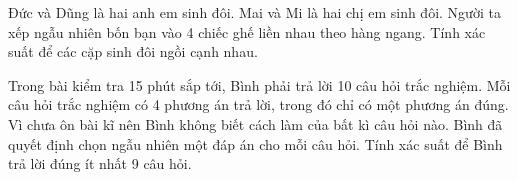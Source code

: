 \documentclass[%
    fontsize=12pt,%
    chapterprefix=false,%
    open=right,%
    twoside=false,%
    numbers=noenddot,%
    headings=optiontohead,%
    final,%
    DIV=15,%
    parskip=half %
]{scrbook}
\begin{document}
\begin{tuluan}
\item Đức và Dũng là hai anh em sinh đôi. Mai và Mi là hai chị em sinh đôi. Người ta xếp ngẫu nhiên bốn bạn vào 4 chiếc ghế liền nhau theo hàng ngang. Tính xác suất để các cặp sinh đôi ngồi cạnh nhau.

\item Trong bài kiểm tra 15 phút sắp tới, Bình phải trả lời 10 câu hỏi trắc nghiệm. Mỗi câu hỏi trắc nghiệm có 4 phương án trả lời, trong đó chỉ có một phương án đúng. Vì chưa ôn bài kĩ nên Bình không biết cách làm của bất kì câu hỏi nào. Bình đã quyết định chọn ngẫu nhiên một đáp án cho mỗi câu hỏi. Tính xác suất để Bình trả lời đúng ít nhất 9 câu hỏi.

\end{tuluan}
\end{document}
